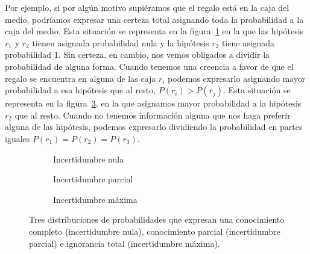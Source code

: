 \documentclass[a4paper,11pt]{book}
\theoremstyle{definition}
\begin{document}
Por ejemplo, si por algún motivo supiéramos que el regalo est\'a en la caja del medio, podr\'iamos expresar una certeza total asignando toda la probabilidad a la caja del medio.
%
Esta situaci\'on se representa en la figura~\ref{fig:preferencia_total} en la que las hip\'otesis $r_1$ y $r_2$ tienen asignada probabilidad nula y la hipótesis $r_2$ tiene asignada probabilidad 1.
%
Sin certeza, en cambio, nos vemos obligados a dividir la probabilidad de alguna forma.
%
Cuando tenemos una creencia a favor de que el regalo se encuentra en alguna de las caja $r_i$ podemos expresarlo asignando mayor probabilidad a esa hipótesis que al resto, $P(r_i) > P(r_j)$.
%
Esta situación se representa en la figura~\ref{fig:preferencia_parcial}, en la que asignamos mayor probabilidad a la hipótesis $r_2$ que al resto.
%
Cuando no tenemos información alguna que nos haga preferir alguna de las hipótesis, podemos expresarlo dividiendo la probabilidad en partes iguales $P(r_1) = P(r_2) = P(r_3)$.
%
\begin{figure}[ht!]
 \centering
 \begin{subfigure}[b]{0.32\textwidth}
 \centering
    \caption{Incertidumbre nula}
    \label{fig:preferencia_total}
 \end{subfigure}
 \hfill
 \begin{subfigure}[b]{0.32\textwidth}
 \centering
    \caption{Incertidumbre parcial}
    \label{fig:preferencia_parcial}
\end{subfigure}
\hfill
 \begin{subfigure}[b]{0.32\textwidth}
 \centering
    \caption{Incertidumbre máxima}
    \label{fig:preferencia_parcial}
\end{subfigure}
\caption{Tres distribuciones de probabilidades que expresan una conocimiento completo (incertidumbre nula), conocimiento parcial (incertidumbre parcial) e ignorancia total (incertidumbre máxima).
 }
\label{fig:distribucion_de_creencias}
\end{figure}
\end{document}
